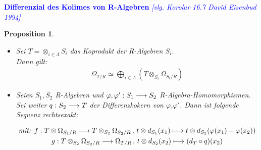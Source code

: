 \documentclass[10pt,a4paper]{report}
\newcommand{\comment}[1]{}
\newcommand{\ModulsOfDifferenzials}{David Eisenbud 1994}
\newcounter{Aussage}[chapter]
\newtheorem{prop}[Aussage]{Proposition}
\newcommand{\functionfront}[3]{\nolinebreak{#1:#2 \longrightarrow #3}}
\newcommand{\function}[5]{\nolinebreak{#1:#2 \longrightarrow #3 \, , \, #4 \longmapsto #5}}
\newcommand{\divR}[2]{\Omega_{#1/#2}}
\newcommand{\divf}[1]{d_{#1}}
\newcommand{\Tensor}[3]{#1 \otimes_{#2} #3}
\newcommand{\tensor}[3]{#1 \otimes #3}
\begin{document}
\textcolor{blue}{\textbf{Differenzial des Kolimes von R-Algebren} \textit{[vlg. Korolar 16.7 \ModulsOfDifferenzials]}}
\comment{Beide Beweise sind sehr kurz gefasst}
\begin{prop} \label{Differenzial des Kolimes von R-Algebren}
\ \\
\begin{itemize}
\item[\textbf{1.}]
Sei $T = \otimes_{i \in \Lambda} S_i$ das Koprodukt der R-Algebren $S_i$.\\
Dann gilt:
\begin{gather*}
\divR{T}{R} \simeq \bigoplus_{i\in \Lambda} ( \Tensor{T}{S_i}{\divR{S_i}{R}} )
\end{gather*}
\item[\textbf{2.}]
Seien $S_1,S_2$ R-Algebren und $\functionfront{\varphi,\varphi'}{S_1}{S_2}$ R-Algebra-Homomorphismen. Sei weiter $\functionfront{q}{S_2}{T}$ der Differenzkokern von $\varphi$,$\varphi '$.
Dann ist folgende Sequenz rechtsexakt:
\begin{center}
\begin{gather*}
\textit{mit: } \function{f}{\tensor{T}{S_1}{\divR{S_1}{R}}}{\Tensor{T}{S_2}{\divR{S_2}{R}}}{\tensor{t}{S_2}{\divf{S_1}(x_1)}}{\tensor{t}{S_2}{\divf{S_2}(\varphi(x_1) - \varphi(x_2))}}\\
\function{g}{\Tensor{T}{S_2}{\divR{S_2}{R}}}{\divR{T}{R}}{\tensor{t}{S_2}{\divf{S_2}(x_2)}}{(\divf{T}\circ q)(x_2)}
\end{gather*}
\end{center}
\end{itemize}
\end{prop}
\end{document}
